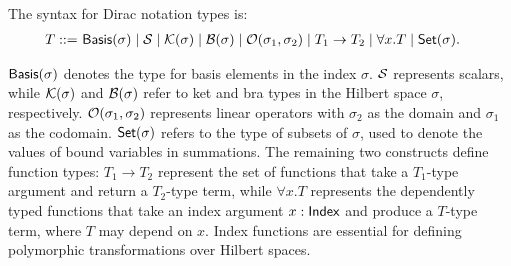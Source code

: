 \begin{definition}
    The syntax for Dirac notation types is:
    \begin{align*}
        T ::=\ & \mathsf{Basis}(\sigma) \mid \mathcal{S} \mid \mathcal{K}(\sigma) \mid \mathcal{B}(\sigma) \mid \mathcal{O}(\sigma_1, \sigma_2) \mid T_1 \to T_2 \mid \forall x.T \mid \mathsf{Set}(\sigma).
    \end{align*}
\end{definition}
\( \mathsf{Basis}(\sigma) \) denotes the type for basis elements in the index
\( \sigma \).  \( \mathcal{S} \) represents scalars, while \(
\mathcal{K}(\sigma) \) and \( \mathcal{B}(\sigma) \) refer to ket and bra types
in the Hilbert space \( \sigma \), respectively.  \( \mathcal{O}(\sigma_1,
\sigma_2) \) represents linear operators with \( \sigma_2 \) as the
domain and \( \sigma_1 \) as the codomain.  \( \mathsf{Set}(\sigma) \) refers
to the type of subsets of \( \sigma \), used to denote the values of
bound variables in summations.  The remaining two constructs define
function types: \( T_1 \to T_2 \) represent the set of functions that
take a \( T_1 \)-type argument and return a \( T_2 \)-type term, while
\( \forall x. T \) represents the dependently typed functions that
take an index argument \( x :\mathsf{Index} \) and produce a \( T \)-type
term, where $T$ may depend on \( x \).  Index functions are essential
for defining polymorphic transformations over Hilbert spaces.


